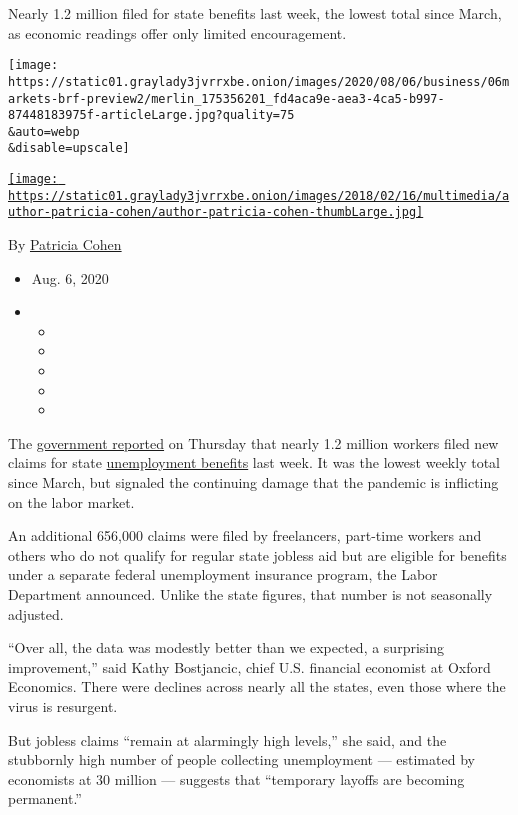 Nearly 1.2 million filed for state benefits last week, the lowest total
since March, as economic readings offer only limited encouragement.

\texttt{[image: https://static01.graylady3jvrrxbe.onion/images/2020/08/06/business/06markets-brf-preview2/merlin\_175356201\_fd4aca9e-aea3-4ca5-b997-87448183975f-articleLarge.jpg?quality=75\\\&auto=webp\\\&disable=upscale]}

\href{https://www.nytimes3xbfgragh.onion/by/patricia-cohen}{\texttt{[image: https://static01.graylady3jvrrxbe.onion/images/2018/02/16/multimedia/author-patricia-cohen/author-patricia-cohen-thumbLarge.jpg]}}

By \href{https://www.nytimes3xbfgragh.onion/by/patricia-cohen}{Patricia
Cohen}

\begin{itemize}
\item
  Aug. 6, 2020
\item
  \begin{itemize}
  \item
  \item
  \item
  \item
  \item
  \end{itemize}
\end{itemize}

The \href{https://oui.doleta.gov/press/2020/080620.pdf}{government
reported} on Thursday that nearly 1.2 million workers filed new claims
for state
\href{https://www.nytimes3xbfgragh.onion/2020/09/03/business/economy/unemployment-claims.html}{unemployment
benefits} last week. It was the lowest weekly total since March, but
signaled the continuing damage that the pandemic is inflicting on the
labor market.

An additional 656,000 claims were filed by freelancers, part-time
workers and others who do not qualify for regular state jobless aid but
are eligible for benefits under a separate federal unemployment
insurance program, the Labor Department announced. Unlike the state
figures, that number is not seasonally adjusted.

``Over all, the data was modestly better than we expected, a surprising
improvement,'' said Kathy Bostjancic, chief U.S. financial economist at
Oxford Economics. There were declines across nearly all the states, even
those where the virus is resurgent.

But jobless claims ``remain at alarmingly high levels,'' she said, and
the stubbornly high number of people collecting unemployment ---
estimated by economists at 30 million --- suggests that ``temporary
layoffs are becoming permanent.''

